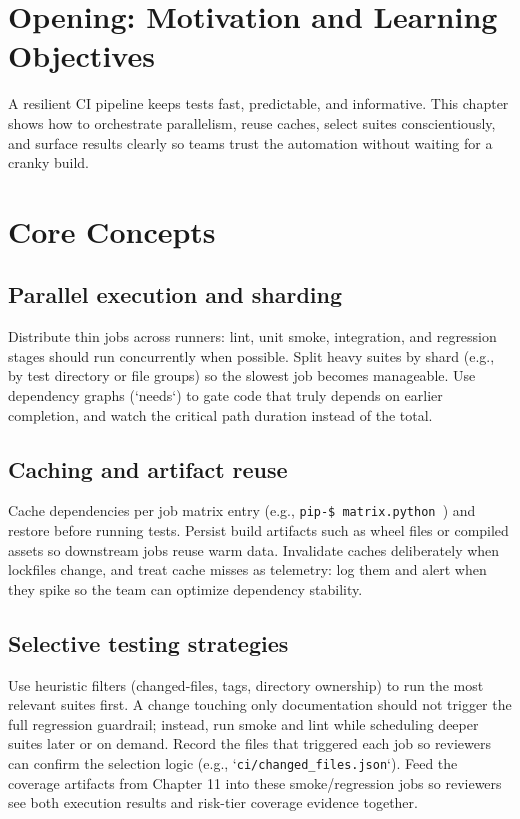 \section{Opening: Motivation and Learning Objectives}
A resilient CI pipeline keeps tests fast, predictable, and informative. This chapter shows how to orchestrate parallelism, reuse caches, select suites conscientiously, and surface results clearly so teams trust the automation without waiting for a cranky build.

\section{Core Concepts}
\subsection{Parallel execution and sharding}
Distribute thin jobs across runners: lint, unit smoke, integration, and regression stages should run concurrently when possible. Split heavy suites by shard (e.g., by test directory or file groups) so the slowest job becomes manageable. Use dependency graphs (`needs`) to gate code that truly depends on earlier completion, and watch the critical path duration instead of the total.

\subsection{Caching and artifact reuse}
Cache dependencies per job matrix entry (e.g., \texttt{pip-\${{ matrix.python }}}) and restore before running tests. Persist build artifacts such as wheel files or compiled assets so downstream jobs reuse warm data. Invalidate caches deliberately when lockfiles change, and treat cache misses as telemetry: log them and alert when they spike so the team can optimize dependency stability.

\subsection{Selective testing strategies}
Use heuristic filters (changed-files, tags, directory ownership) to run the most relevant suites first. A change touching only documentation should not trigger the full regression guardrail; instead, run smoke and lint while scheduling deeper suites later or on demand. Record the files that triggered each job so reviewers can confirm the selection logic (e.g., `\texttt{ci/changed\_files.json}`). Feed the coverage artifacts from Chapter 11 into these smoke/regression jobs so reviewers see both execution results and risk-tier coverage evidence together.

